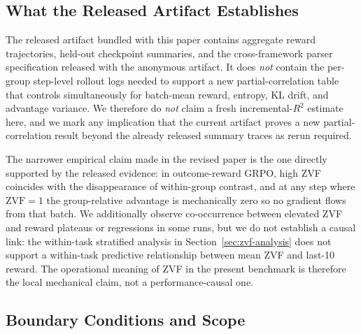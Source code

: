 \documentclass{article}
\begin{document}
\subsection{What the Released Artifact Establishes}

The released artifact bundled with this paper contains aggregate reward
trajectories, held-out checkpoint summaries, and the cross-framework parser
specification released with the anonymous artifact. It does
\emph{not} contain the per-group step-level rollout logs needed to support
a new partial-correlation table that controls simultaneously for
batch-mean reward, entropy, KL drift, and advantage variance. We therefore
do \emph{not} claim a fresh incremental-$R^2$ estimate here, and we mark
any implication that the current artifact proves a new partial-correlation
result beyond the already released summary traces as rerun required.

The narrower empirical claim made in the revised paper is the one directly
supported by the released evidence: in outcome-reward GRPO, high ZVF
coincides with the disappearance of within-group contrast, and at any step
where $\mathrm{ZVF}=1$ the group-relative advantage is mechanically zero so
no gradient flows from that batch. We additionally observe co-occurrence
between elevated ZVF and reward plateaus or regressions in some runs, but
we do not establish a causal link: the within-task stratified analysis in
Section~\ref{sec:zvf-analysis} does not support a within-task predictive
relationship between mean ZVF and last-10 reward. The operational meaning
of ZVF in the present benchmark is therefore the local mechanical claim,
not a performance-causal one.

\subsection{Boundary Conditions and Scope}
\end{document}
